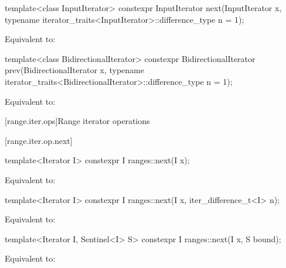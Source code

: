 \documentclass{wg21}
\begin{document}
%
\begin{itemdecl}
	template<class InputIterator>
	constexpr InputIterator next(InputIterator x,
	typename iterator_traits<InputIterator>::difference_type n = 1);
\end{itemdecl}

\begin{itemdescr}
	\pnum
	\effects Equivalent to: 
\end{itemdescr}

%
\begin{itemdecl}
	template<class BidirectionalIterator>
	constexpr BidirectionalIterator prev(BidirectionalIterator x,
	typename iterator_traits<BidirectionalIterator>::difference_type n = 1);
\end{itemdecl}

\begin{itemdescr}
	\pnum
	\effects Equivalent to: 
\end{itemdescr}

[range.iter.ops]{Range iterator operations}


[range.iter.op.next]{}

%
\begin{itemdecl}
	template<Iterator I>
	constexpr I ranges::next(I x);
\end{itemdecl}

\begin{itemdescr}
	\pnum
	\effects Equivalent to: 
\end{itemdescr}

%
\begin{itemdecl}
	template<Iterator I>
	constexpr I ranges::next(I x, iter_difference_t<I> n);
\end{itemdecl}

\begin{itemdescr}
	\pnum
	\effects Equivalent to: 
\end{itemdescr}

%
\begin{itemdecl}
	template<Iterator I, Sentinel<I> S>
	constexpr I ranges::next(I x, S bound);
\end{itemdecl}

\begin{itemdescr}
	\pnum
	\effects Equivalent to: 
\end{itemdescr}
\end{document}
